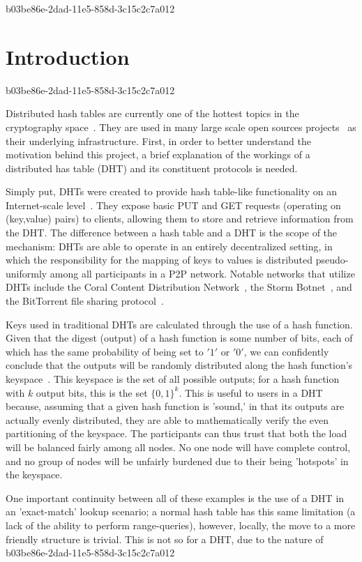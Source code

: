\documentclass[12pt]{article}
\begin{document}
b03be86e-2dad-11e5-858d-3c15c2c7a012\section{Introduction}
b03be86e-2dad-11e5-858d-3c15c2c7a012\par Distributed hash tables are currently one of the hottest topics in the cryptography space~\cite{Stoica:2001dj,Rowstron:2001ea,Ratnasamy:2001wn}. They are used in many large scale open sources projects~\cite{Freitas:2013tb,Xu:2010vs,Perfitt:2010fh} as their underlying infrastructure. First, in order to better understand the motivation behind this project, a brief explanation of the workings of a distributed has table (DHT) and its constituent protocols is needed.

\par Simply put, DHTs were created to provide hash table-like functionality on an Internet-scale level~\cite{Ratnasamy:2001wn}. They expose basic PUT and GET requests (operating on (key,value) pairs) to clients, allowing them to store and retrieve information from the DHT. The difference between a hash table and a DHT is the scope of the mechanism: DHTs are able to operate in an entirely decentralized setting, in which the responsibility for the mapping of keys to values is distributed pseudo-uniformly among all participants in a P2P network. Notable networks that utilize DHTs include the Coral Content Distribution Network~\cite{Freedman:2004vb}, the Storm Botnet~\cite{Holz:2008uk}, and the BitTorrent file sharing protocol~\cite{Cohen:y1_8mBnw}.

\par Keys used in traditional DHTs are calculated through the use of a hash function. Given that the digest (output) of a hash function is some number of bits, each of which has the same probability of being set to $'1'$ or $'0'$, we can confidently conclude that the outputs will be randomly distributed along the hash function's keyspace~. This keyspace is the set of all possible outputs; for a hash function with $k$ output bits, this is the set $\{0,1\}^k$. This is useful to users in a DHT because, assuming that a given hash function is 'sound,' in that its outputs are actually evenly distributed, they are able to mathematically verify the even partitioning of the keyspace. The participants can thus trust that both the load will be balanced fairly among all nodes. No one node will have complete control, and no group of nodes will be unfairly burdened due to their being 'hotspots' in the keyspace.~

\par One important continuity between all of these examples is the use of a DHT in an 'exact-match' lookup scenario; a normal hash table has this same limitation (a lack of the ability to perform range-queries), however, locally, the move to a more friendly structure is trivial. This is not so for a DHT, due to the nature of
\printbibliography
b03be86e-2dad-11e5-858d-3c15c2c7a012
\end{document}
